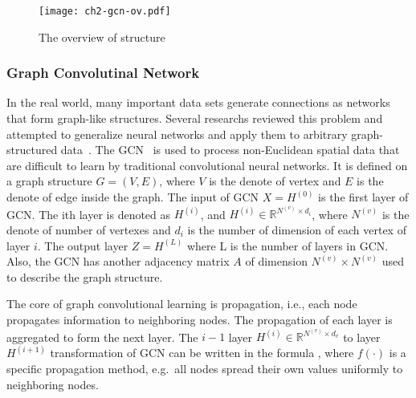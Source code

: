 \begin{figure}[htbp!]
    \centering
    \texttt{[image: ch2-gcn-ov.pdf]}
    \caption{The overview of structure}\label{fig:ch2-gcn-ov}
\end{figure}



\subsubsection{Graph Convolutinal Network}

In the real world, many important data sets generate connections as networks that form graph-like structures. Several researchs reviewed this problem and attempted to generalize neural networks and apply them to arbitrary graph-structured data~\cite{wu2018socialgcn, dettmers2018convolutional}. The GCN~\cite{kipf2016semi} is used to process non-Euclidean spatial data that are difficult to learn by traditional convolutional neural networks. It is defined on a graph structure \(G=(V, E)\), where \(V\) is the denote of vertex and \(E\) is the denote of edge inside the graph. The input of GCN \(X = H^{(0)}\) is the first layer of GCN. The ith layer is denoted as \(H^{(i)}\), and \(H^{(i)}\in \mathbb{R}^{N^{(v)}\times d_{i}}\), where \(N^{(v)}\) is the denote of number of vertexes and \(d_{i}\) is the number of dimension of each vertex of layer \(i\). The output layer \(Z = H^{(L)}\) where L is the number of layers in GCN\@. Also, the GCN has another adjacency matrix \(A\) of dimension \(N^{(v)}\times N^{(v)}\) used to describe the graph structure.

The core of graph convolutional learning is propagation, i.e., each node propagates information to neighboring nodes. The propagation of each layer is aggregated to form the next layer. The \(i-1\) layer \(H^{(i)}\in \mathbb{R}^{N^{(v)}\times d_v}\) to layer \(H^{(i+1)}\) transformation of GCN can be written in the formula \eqname{\ref{fml:ch2-gcnlayer}}, where \(f(\cdot)\) is a specific propagation method, e.g.\ all nodes spread their own values uniformly to neighboring nodes.

